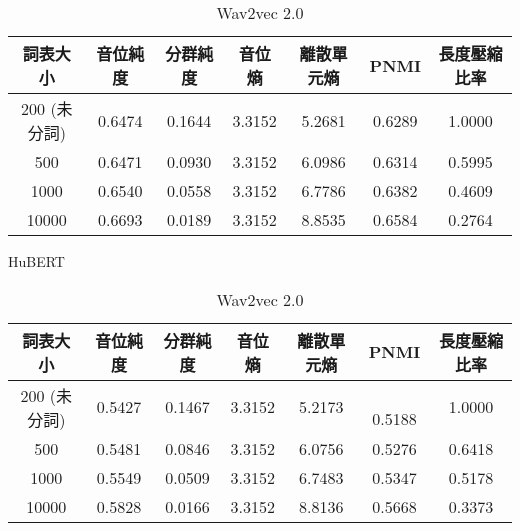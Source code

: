 

\begin{table}[!htbp]
    \centering
    \begin{subtable}[t]{\textwidth}
        \centering
        \begin{tabular}{|c|c|c|c|c|c|c|} \hline 
                詞表大小  & 音位純度 & 分群純度 & 音位熵 & 離散單元熵 &    PNMI & 長度壓縮比率 \\ \hline 
200 (未分詞)&   0.6474 &   0.1644 & 3.3152 &     5.2681 & 0.6289 &1.0000\\ \hline 
                    500   & 0.6471   & 0.0930   & 3.3152 &  6.0986    &  0.6314 &  0.5995  \\ \hline %
                   1000   & 0.6540   & 0.0558   & 3.3152 &  6.7786    &  0.6382 &  0.4609  \\ \hline %
                  10000   & 0.6693   & 0.0189   & 3.3152 &  8.8535    &  0.6584 &  0.2764  \\ \hline %
        \end{tabular}
\caption{HuBERT}
        \label{tab:ch4-phn-model-hubert}
    \end{subtable}        

    \jefftablesep        

    \begin{subtable}[t]{\textwidth}
        \centering
        \begin{tabular}{|c|c|c|c|c|c|c|} \hline 
                詞表大小  & 音位純度 & 分群純度 & 音位熵 & 離散單元熵 &    PNMI & 長度壓縮比率 \\ \hline 
200 (未分詞)&   0.5427 &   0.1467 & 3.3152 &     5.2173 &　0.5188 &1.0000\\ \hline 
                    500   & 0.5481   & 0.0846   & 3.3152 &  6.0756    &  0.5276 &  0.6418  \\ \hline %
                   1000   & 0.5549   & 0.0509   & 3.3152 &  6.7483    &  0.5347 &  0.5178  \\ \hline %
                  10000   & 0.5828   & 0.0166   & 3.3152 &  8.8136    &  0.5668 &  0.3373  \\ \hline %
        \end{tabular}
\caption{Wav2vec 2.0}
        \label{tab:ch4-phn-model-w2v2}
    \end{subtable}        

    
    \jefftablesep        


\end{table}
